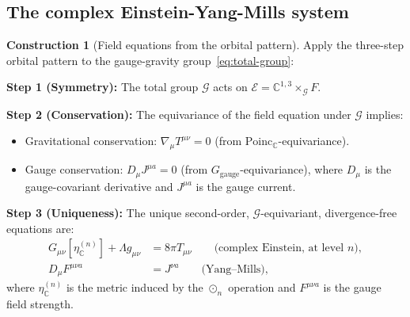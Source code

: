 \documentclass[12pt]{article}
\theoremstyle{plain}
\theoremstyle{definition}
\newtheorem{construction}[theorem]{Construction}
\theoremstyle{remark}
\newcommand{\Poinc}{\mathrm{Poinc}}
\newcommand{\CC}{\mathbb{C}}
\begin{document}
\subsection{The complex Einstein-Yang-Mills system}

\begin{construction}[Field equations from the orbital pattern]\label{constr:eym}
Apply the three-step orbital pattern to the gauge-gravity group~\eqref{eq:total-group}:

\textbf{Step 1 (Symmetry):} The total group $\mathcal{G}$ acts on $\mathcal{E} = \CC^{1,3} \times_\mathcal{G} F$.

\textbf{Step 2 (Conservation):} The equivariance of the field equation under $\mathcal{G}$ implies:
\begin{itemize}
    \item Gravitational conservation: $\nabla_\mu T^{\mu\nu} = 0$ (from $\Poinc_\CC$-equivariance).
    \item Gauge conservation: $D_\mu J^{\mu a} = 0$ (from $G_{\mathrm{gauge}}$-equivariance), where $D_\mu$ is the gauge-covariant derivative and $J^{\mu a}$ is the gauge current.
\end{itemize}

\textbf{Step 3 (Uniqueness):} The unique second-order, $\mathcal{G}$-equivariant, divergence-free equations are:
\begin{align}
G_{\mu\nu}[\eta_\CC^{(n)}] + \Lambda g_{\mu\nu} &= 8\pi T_{\mu\nu} \qquad\text{(complex Einstein, at level $n$)}, \label{eq:complex-einstein} \\
D_\mu F^{\mu\nu a} &= J^{\nu a} \qquad\text{(Yang--Mills)}, \label{eq:ym}
\end{align}
where $\eta_\CC^{(n)}$ is the metric induced by the $\odot_n$ operation and $F^{\mu\nu a}$ is the gauge field strength.
\end{construction}
\end{document}

